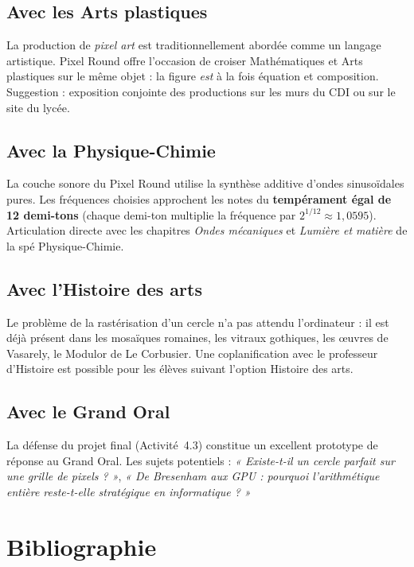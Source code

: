 \documentclass[12pt,a4paper]{scrartcl}
\newcommand{\acc}[1]{\textcolor{accent}{\textbf{#1}}}
\begin{document}
\subsection{Avec les Arts plastiques}
La production de \emph{pixel art} est traditionnellement abordée comme un langage artistique. Pixel Round offre l'occasion de croiser Mathématiques et Arts plastiques sur le même objet : la figure \emph{est} à la fois équation et composition. Suggestion : exposition conjointe des productions sur les murs du CDI ou sur le site du lycée.

\subsection{Avec la Physique-Chimie}
La couche sonore du Pixel Round utilise la synthèse additive d'ondes sinusoïdales pures. Les fréquences choisies approchent les notes du \acc{tempérament égal de 12 demi-tons} (chaque demi-ton multiplie la fréquence par $2^{1/12} \approx 1{,}0595$). Articulation directe avec les chapitres \emph{Ondes mécaniques} et \emph{Lumière et matière} de la spé Physique-Chimie.

\subsection{Avec l'Histoire des arts}
Le problème de la rastérisation d'un cercle n'a pas attendu l'ordinateur : il est déjà présent dans les mosaïques romaines, les vitraux gothiques, les œuvres de Vasarely, le Modulor de Le Corbusier. Une coplanification avec le professeur d'Histoire est possible pour les élèves suivant l'option Histoire des arts.

\subsection{Avec le Grand Oral}
La défense du projet final (Activité~4.3) constitue un excellent prototype de réponse au Grand Oral. Les sujets potentiels : \emph{« Existe-t-il un cercle parfait sur une grille de pixels ? »}, \emph{« De Bresenham aux GPU : pourquoi l'arithmétique entière reste-t-elle stratégique en informatique ? »}

\section{Bibliographie}
\end{document}
